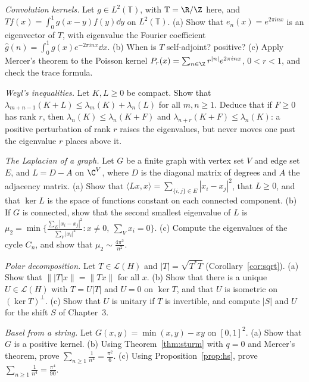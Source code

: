 \begin{exercise}[$\star$]\label{ex:toeplitz}
\emph{Convolution kernels.} Let $g\in L^2(\mathbb T)$, with $\mathbb T=\R/\Z$ here, and $Tf(x)=\int_0^1g(x-y)f(y)\dd y$ on $L^2(\mathbb T)$. (a) Show that $e_n(x)=e^{2\pi inx}$ is an eigenvector of $T$, with eigenvalue the Fourier coefficient
$\hat g(n)=\int_0^1g(x)e^{-2\pi inx}\dd x$. (b) When is $T$ self-adjoint? positive? (c) Apply Mercer's theorem to the Poisson kernel $P_r(x)=\sum_{n\in\Z}r^{|n|}e^{2\pi inx}$, $0<r<1$, and check the trace formula.
\end{exercise}

\begin{exercise}[$\star\star$]\label{ex:weylineq}
\emph{Weyl's inequalities.} Let $K,L\ge0$ be compact. Show that $\lambda_{m+n-1}(K+L)\le\lambda_m(K)+\lambda_n(L)$ for all $m,n\ge1$. Deduce that if $F\ge0$ has rank $r$, then $\lambda_n(K)\le\lambda_n(K+F)$ and $\lambda_{n+r}(K+F)\le\lambda_n(K)$: a
positive perturbation of rank $r$ raises the eigenvalues, but never moves one past the eigenvalue $r$ places above it.
\end{exercise}

\begin{exercise}[$\star$]\label{ex:graphlaplacian}
\emph{The Laplacian of a graph.} Let $G$ be a finite graph with vertex set $V$ and edge set $E$, and $L=D-A$ on $\C^V$, where $D$ is the diagonal matrix of degrees and $A$ the adjacency matrix. (a) Show that
$\langle Lx,x\rangle=\sum_{\{i,j\}\in E}|x_i-x_j|^2$, that $L\ge0$, and that $\ker L$ is the space of functions constant on each connected component. (b) If $G$ is connected, show that the second smallest eigenvalue of $L$ is
$\mu_2=\min\bigl\{\frac{\sum_E|x_i-x_j|^2}{\sum_V|x_i|^2}:x\ne0,\ \sum_Vx_i=0\bigr\}$. (c) Compute the eigenvalues of the cycle $C_n$, and show that $\mu_2\sim\frac{4\pi^2}{n^2}$.
\end{exercise}

\begin{exercise}[$\star\star$]\label{ex:polar}
\emph{Polar decomposition.} Let $T\in\mathcal L(H)$ and $|T|=\sqrt{T^*T}$ (Corollary~\ref{cor:sqrt}). (a) Show that $\||T|x\|=\|Tx\|$ for all $x$. (b) Show that there is a unique $U\in\mathcal L(H)$ with $T=U|T|$ and $U=0$ on
$\ker T$, and that $U$ is isometric on $(\ker T)^\perp$. (c) Show that $U$ is unitary if $T$ is invertible, and compute $|S|$ and $U$ for the shift $S$ of Chapter~3.
\end{exercise}

\begin{exercise}[$\star$]\label{ex:basel}
\emph{Basel from a string.} Let $G(x,y)=\min(x,y)-xy$ on $[0,1]^2$. (a) Show that $G$ is a positive kernel. (b) Using Theorem~\ref{thm:sturm} with $q=0$ and Mercer's theorem, prove $\sum_{n\ge1}\frac1{n^2}=\frac{\pi^2}6$.
(c) Using Proposition~\ref{prop:hs}, prove $\sum_{n\ge1}\frac1{n^4}=\frac{\pi^4}{90}$.
\end{exercise}

